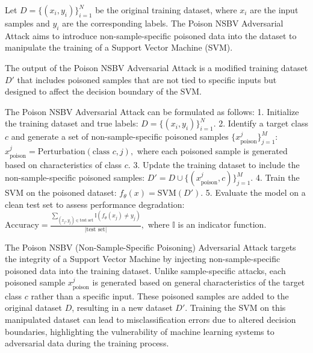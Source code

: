 Let \( D = \{(x_i, y_i)\}_{i=1}^N \) be the original training dataset, where \( x_i \) are the input samples and \( y_i \) are the corresponding labels. The Poison NSBV Adversarial Attack aims to introduce non-sample-specific poisoned data into the dataset to manipulate the training of a Support Vector Machine (SVM).

The output of the Poison NSBV Adversarial Attack is a modified training dataset \( D' \) that includes poisoned samples that are not tied to specific inputs but designed to affect the decision boundary of the SVM.

The Poison NSBV Adversarial Attack can be formulated as follows:
1. Initialize the training dataset and true labels:
   $
   D = \{(x_i, y_i)\}_{i=1}^N.
   $
2. Identify a target class \( c \) and generate a set of non-sample-specific poisoned samples \( \{x_{\text{poison}}^j\}_{j=1}^M \):
   $
   x_{\text{poison}}^j = \text{Perturbation}(\text{class } c, j),
   $
   where each poisoned sample is generated based on characteristics of class \( c \).
3. Update the training dataset to include the non-sample-specific poisoned samples:
   $
   D' = D \cup \{(x_{\text{poison}}^j, c)\}_{j=1}^M.
   $
4. Train the SVM on the poisoned dataset:
   $
   f_{\theta}(x) = \text{SVM}(D').
   $
5. Evaluate the model on a clean test set to assess performance degradation:
   $
   \text{Accuracy} = \frac{\sum_{(x_j, y_j) \in \text{test set}} \mathbb{I}(f_{\theta}(x_j) \neq y_j)}{|\text{test set}|},
   $
   where \( \mathbb{I} \) is an indicator function.

The Poison NSBV (Non-Sample-Specific Poisoning) Adversarial Attack targets the integrity of a Support Vector Machine by injecting non-sample-specific poisoned data into the training dataset. Unlike sample-specific attacks, each poisoned sample \( x_{\text{poison}}^j \) is generated based on general characteristics of the target class \( c \) rather than a specific input. These poisoned samples are added to the original dataset \( D \), resulting in a new dataset \( D' \). Training the SVM on this manipulated dataset can lead to misclassification errors due to altered decision boundaries, highlighting the vulnerability of machine learning systems to adversarial data during the training process.
